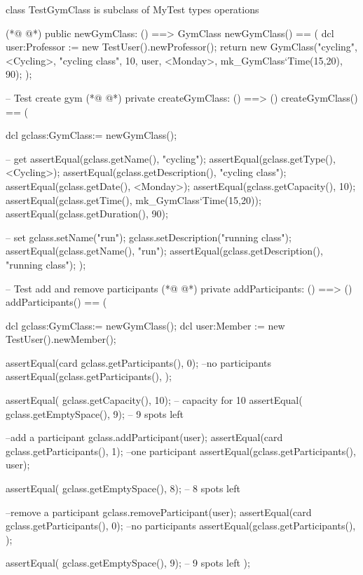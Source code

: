 \begin{vdmpp}[breaklines=true]
class TestGymClass is subclass of MyTest
types
operations
 
(*@
\label{newGymClass:5}
@*)
 public newGymClass: () ==> GymClass
 newGymClass() == (
   dcl user:Professor := new TestUser().newProfessor();
   return new GymClass("cycling", <Cycling>, "cycling class", 10, user, <Monday>, mk_GymClass`Time(15,20), 90);
 );
  
 -- Test create gym 
(*@
\label{createGymClass:12}
@*)
 private createGymClass: () ==> ()
 createGymClass() == (
    
    dcl gclass:GymClass:= newGymClass();
   
     -- get
    assertEqual(gclass.getName(), "cycling");
    assertEqual(gclass.getType(), <Cycling>);
    assertEqual(gclass.getDescription(), "cycling class");
    assertEqual(gclass.getDate(), <Monday>);
    assertEqual(gclass.getCapacity(), 10);
    assertEqual(gclass.getTime(), mk_GymClass`Time(15,20));
    assertEqual(gclass.getDuration(), 90);
    
    -- set
    gclass.setName("run");
    gclass.setDescription("running class");
    assertEqual(gclass.getName(), "run");
    assertEqual(gclass.getDescription(), "running class");
 );
 
 -- Test add and remove participants
(*@
\label{addParticipants:34}
@*)
 private addParticipants: () ==> ()
 addParticipants() == (
    
    dcl gclass:GymClass:= newGymClass();
     dcl user:Member := new TestUser().newMember();
    
     assertEqual(card gclass.getParticipants(), 0);     --no participants
     assertEqual(gclass.getParticipants(), {});
      
     assertEqual( gclass.getCapacity(), 10);            -- capacity for 10 
     assertEqual( gclass.getEmptySpace(), 9);         -- 9 spots left
     
     --add a participant
    gclass.addParticipant(user);
    assertEqual(card gclass.getParticipants(), 1);   --one participant
     assertEqual(gclass.getParticipants(), {user});
     
     assertEqual( gclass.getEmptySpace(), 8);         -- 8 spots left
   
   --remove a participant
    gclass.removeParticipant(user);
    assertEqual(card gclass.getParticipants(), 0);   --no participants
     assertEqual(gclass.getParticipants(), {});
     
     assertEqual( gclass.getEmptySpace(), 9);         -- 9 spots left
 );
 

\end{vdmpp}
